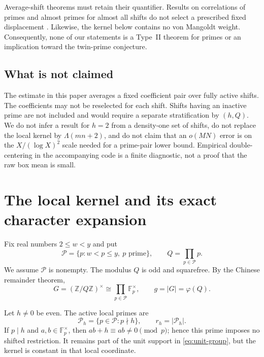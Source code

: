 \documentclass[11pt]{article}
\theoremstyle{definition}
\theoremstyle{remark}
\newcommand{\Z}{\mathbb Z}
\newcommand{\F}{\mathbb F}
\newcommand{\cP}{\mathcal P}
\begin{document}
Average-shift theorems must retain their quantifier.  Results on correlations of primes and almost primes for almost all shifts do not select a prescribed fixed displacement \citep{MatomakiRadziwillTao2019,Evans2023}.  Likewise, the kernel below contains no von Mangoldt weight.  Consequently, none of our statements is a Type~II theorem for primes or an implication toward the twin-prime conjecture.

\subsection*{What is not claimed}

The estimate in this paper averages a fixed coefficient pair over fully active shifts.  The coefficients may not be reselected for each shift.  Shifts having an inactive prime are not included and would require a separate stratification by $(h,Q)$.  We do not infer a result for $h=2$ from a density-one set of shifts, do not replace the local kernel by $\Lambda(mn+2)$, and do not claim that an $o(MN)$ error is on the $X/(\log X)^2$ scale needed for a prime-pair lower bound.  Empirical double-centering in the accompanying code is a finite diagnostic, not a proof that the raw box mean is small.

\section{The local kernel and its exact character expansion}\label{sec:kernel}

Fix real numbers $2\le w<y$ and put
\begin{equation}\label{eq:prime-window}
 \cP=\{p:w<p\le y,\ p\text{ prime}\},
 \qquad
 Q=\prod_{p\in\cP}p.
\end{equation}
We assume $\cP$ is nonempty.  The modulus $Q$ is odd and squarefree.  By the Chinese remainder theorem,
\begin{equation}\label{eq:unit-group}
 G=(\Z/Q\Z)^\times
   \cong\prod_{p\in\cP}\F_p^\times,
 \qquad g=|G|=\varphi(Q).
\end{equation}

Let $h\ne0$ be even.  The active local primes are
\begin{equation}\label{eq:active-primes}
 \cP_h=\{p\in\cP:p\nmid h\},
 \qquad r_h=|\cP_h|.
\end{equation}
If $p\mid h$ and $a,b\in\F_p^\times$, then $ab+h\equiv ab\ne0\pmod p$; hence this prime imposes no shifted restriction.  It remains part of the unit support in \eqref{eq:unit-group}, but the kernel is constant in that local coordinate.
\end{document}
